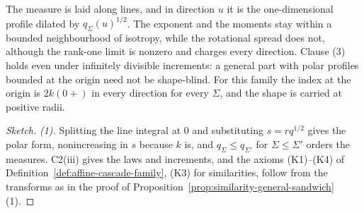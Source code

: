 The \Levy{} measure is laid along lines, and in direction $u$ it is the one-dimensional profile dilated
by $q_\Sigma(u)^{1/2}$. The exponent and the moments stay within a bounded neighbourhood of isotropy,
while the rotational spread does not, although the rank-one limit is nonzero and charges every
direction. Clause (3) holds even under infinitely divisible increments: a general part with polar
profiles bounded at the origin need not be shape-blind. For this family the index at the origin is
$2k(0{+})$ in every direction for every $\Sigma$, and the shape is carried at positive radii.

\begin{proof}[Sketch]
\emph{(1).} Splitting the line integral at $0$ and substituting $s = rq^{1/2}$ gives the polar form,
nonincreasing in $s$ because $k$ is, and $q_\Sigma \le q_{\Sigma'}$ for $\Sigma \le \Sigma'$ orders the
measures. C2(iii) gives the laws and increments, and the axioms (K1)--(K4) of
Definition~\ref{def:affine-cascade-family}, (K3) for similarities, follow from the transforms as in the
proof of Proposition~\ref{prop:similarity-general-sandwich}(1).


\end{proof}
